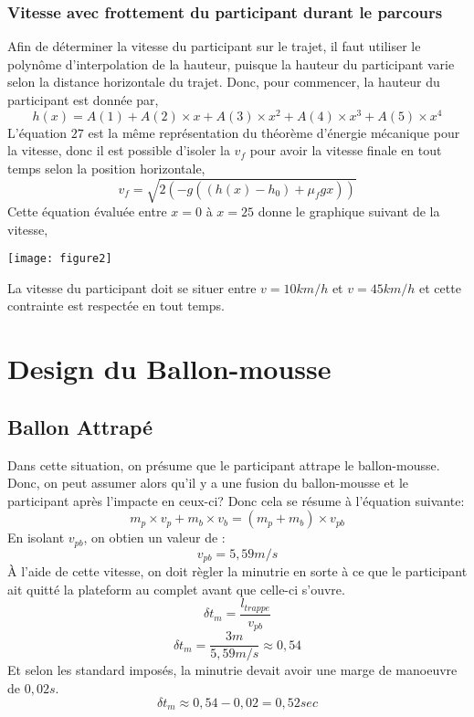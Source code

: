 \documentclass[12pt]{article}
\begin{document}
\subsubsection{Vitesse avec frottement du participant durant le parcours}
Afin de déterminer la vitesse du participant sur le trajet, il faut utiliser le polynôme d'interpolation de la hauteur, puisque la hauteur du participant varie selon la distance horizontale du trajet.
\newline
\newline
Donc, pour commencer, la hauteur du participant est donnée par,
\begin{equation}
h(x) = A(1) + A(2)\times x + A(3)\times x^2 + A(4)\times x^3 + A(5)\times x^4
\end{equation}
L'équation $27$ est la même représentation du théorème d'énergie mécanique pour la vitesse, donc il est possible d'isoler la $v_f$ pour avoir la vitesse finale en tout temps selon la position horizontale,
\begin{equation}
v_f = \sqrt{2(-g((h(x)-h_0)+\mu_fgx))}
\end{equation}
Cette équation évaluée entre $x = 0$ à $x = 25$ donne le graphique suivant de la vitesse,
\begin{center}
	\texttt{[image: figure2]}
\end{center}
La vitesse du participant doit se situer entre $v = 10km/h$ et $v = 45km/h$ et cette contrainte est respectée en tout temps.

\section{Design du Ballon-mousse}
\subsection{Ballon Attrapé}
Dans cette situation, on présume que le participant attrape le ballon-mousse. Donc, on peut assumer alors qu'il y a une fusion du ballon-mousse et le participant après l'impacte en ceux-ci? Donc cela se résume à l'équation suivante:
\begin{equation}
m_p\times v_p + m_b\times v_b = (m_p + m_b)\times v_{pb}
\end{equation}
En isolant $v_{pb}$, on obtien un valeur de :
\begin{equation}
v_{pb} = 5,59m/s
\end{equation}
À l'aide de cette vitesse, on doit règler la minutrie en sorte à ce que le participant ait quitté la plateform au complet avant que celle-ci s'ouvre.
\begin{equation}
\delta t_m = \frac{l_{trappe}}{v_{pb}}
\end{equation}
\begin{equation}
\delta t_m = \frac{3m}{5,59m/s} \approx{0,54}
\end{equation}
Et selon les standard imposés, la minutrie devait avoir une marge de manoeuvre de $0,02s$.
\begin{equation}
\delta t_m \approx{0,54 - 0,02} = 0,52sec
\end{equation}
\end{document}

